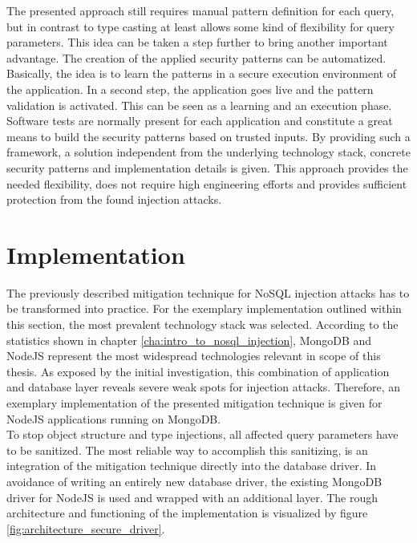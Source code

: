 The presented approach still requires manual pattern definition for each query, but in contrast to type casting at least allows some kind of flexibility for query parameters. This idea can be taken a step further to bring another important advantage. The creation of the applied security patterns can be automatized. Basically, the idea is to learn the patterns in a secure execution environment of the application. In a second step, the application goes live and the pattern validation is activated. This can be seen as a learning and an execution phase. Software tests are normally present for each application and constitute a great means to build the security patterns based on trusted inputs. By providing such a framework, a solution independent from the underlying technology stack, concrete security patterns and implementation details is given. This approach provides the needed flexibility, does not require high engineering efforts and provides sufficient protection from the found injection attacks.

\section{Implementation}
The previously described mitigation technique for NoSQL injection attacks has to be transformed into practice. For the exemplary implementation outlined within this section, the most prevalent technology stack was selected. According to the statistics shown in chapter \ref{cha:intro_to_nosql_injection}, MongoDB and NodeJS represent the most widespread technologies relevant in scope of this thesis. As exposed by the initial investigation, this combination of application and database layer reveals severe weak spots for injection attacks. Therefore, an exemplary implementation of the presented mitigation technique is given for NodeJS applications running on MongoDB. \\ 

To stop object structure and type injections, all affected query parameters have to be sanitized. The most reliable way to accomplish this sanitizing, is an integration of the mitigation technique directly into the database driver. In avoidance of writing an entirely new database driver, the existing MongoDB driver for NodeJS is used and wrapped with an additional layer. The rough architecture and functioning of the implementation is visualized by figure \ref{fig:architecture_secure_driver}. \\

